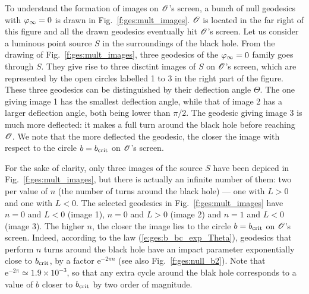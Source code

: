 To understand the formation of images on $\mathscr{O}$'s screen, a bunch of null
geodesics with $\varphi_\infty=0$ is drawn in Fig.~\ref{f:ges:mult_images}.
$\mathscr{O}$ is located in the far right of this figure and
all the drawn geodesics eventually hit $\mathscr{O}$'s screen. Let us consider a luminous point source
$S$ in the surroundings of the black hole. From the drawing of Fig.~\ref{f:ges:mult_images},
three geodesics of the $\varphi_\infty=0$ family goes through $S$. They give rise to
three disctint images of $S$ on $\mathscr{O}$'s screen, which are represented by the
open circles labelled 1 to 3 in the right part of the figure. These three
geodesics can be distinguished by their deflection angle $\Theta$.
The one giving image 1 has the smallest deflection angle, while that
of image 2 has a larger deflection angle, both being lower than $\pi/2$.
The geodesic giving image 3 is much more deflected: it makes a full turn around
the black hole before reaching $\mathscr{O}$. We note that the more deflected the geodesic,
the closer the image with respect to the circle $b = b_{\rm crit}$ on $\mathscr{O}$'s
screen.

For the sake of clarity, only three images of the source $S$ have been
depiced in Fig.~\ref{f:ges:mult_images}, but there is actually an infinite
number of them: two per value of $n$ (the number of turns around the black hole)
--- one with $L>0$ and one with $L<0$. The selected geodesics in
Fig.~\ref{f:ges:mult_images} have $n=0$ and $L<0$ (image 1), $n=0$ and $L>0$
(image 2) and $n=1$ and $L<0$ (image 3). The higher $n$, the closer the image
lies to the circle $b=b_{\rm crit}$ on $\mathscr{O}$'s screen. Indeed, according to the
law (\ref{e:ges:b_bc_exp_Theta}), geodesics that perform $n$ turns around the
black hole have an impact parameter exponentially close to $b_{\rm crit}$,
by a factor $\mathrm{e}^{- 2\pi n}$ (see also Fig.~\ref{f:ges:null_b2}).
Note that $\mathrm{e}^{- 2\pi}\simeq 1.9\times 10^{-3}$, so that any extra cycle
around the blak hole corresponds to a value of $b$ closer to $b_{\rm crit}$
by two order of magnitude.

